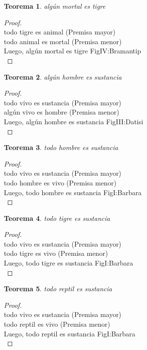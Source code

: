﻿\documentclass[12pt]{book}
\newtheorem{theorem}{Teorema}[chapter]
\newtheorem{proof}{Demostración}
\begin{document}
\begin{theorem}
algún mortal es tigre
\label{th: 57}
\end{theorem}\begin{proof}\\todo tigre es animal	 (Premisa mayor) \\todo animal es mortal	 (Premisa menor) \\Luego, algún mortal es tigre	FigIV:Bramantip \\ \end{proof}
\begin{theorem}
algún hombre es sustancia
\label{th: 58}
\end{theorem}\begin{proof}\\todo vivo es sustancia	 (Premisa mayor) \\algún vivo es hombre	 (Premisa menor) \\Luego, algún hombre es sustancia	FigIII:Datisi \\ \end{proof}
\begin{theorem}
todo hombre es sustancia
\label{th: 59}
\end{theorem}\begin{proof}\\todo vivo es sustancia	 (Premisa mayor) \\todo hombre es vivo	 (Premisa menor) \\Luego, todo hombre es sustancia	FigI:Barbara \\ \end{proof}
\begin{theorem}
todo tigre es sustancia
\label{th: 60}
\end{theorem}\begin{proof}\\todo vivo es sustancia	 (Premisa mayor) \\todo tigre es vivo	 (Premisa menor) \\Luego, todo tigre es sustancia	FigI:Barbara \\ \end{proof}
\begin{theorem}
todo reptil es sustancia
\label{th: 61}
\end{theorem}\begin{proof}\\todo vivo es sustancia	 (Premisa mayor) \\todo reptil es vivo	 (Premisa menor) \\Luego, todo reptil es sustancia	FigI:Barbara \\ \end{proof}
\end{document}
